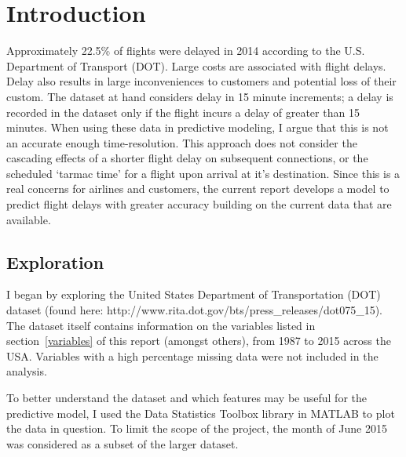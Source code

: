 \documentclass[a4paper, 10pt]{article}
\begin{document}
\clearpage

\section{Introduction}\label{intro}

Approximately 22.5\% of flights were delayed in 2014 according to the U.S. Department of Transport (DOT). Large costs are associated with flight delays.  Delay also results in large inconveniences to customers and potential loss of their custom. The dataset at hand considers delay in 15 minute increments; a delay is recorded in the dataset only if the flight incurs a delay of greater than 15 minutes. When using these data in predictive modeling, I argue that this is not an accurate enough time-resolution. This approach does not consider the cascading effects of a shorter flight delay on subsequent connections, or the scheduled `tarmac time' for a flight upon arrival at it's destination. Since this is a real concerns for airlines and customers, the current report develops a model to predict flight delays with greater accuracy building on the current data that are available. 

\subsection{Exploration}
I began by exploring the United States Department of Transportation (DOT) dataset (found here: http://www.rita.dot.gov/bts/press\_releases/dot075\_15). The dataset itself contains information on the variables listed in section~\ref{variables} of this report (amongst others), from 1987 to 2015 across the USA. Variables with a high percentage missing data were not included in the analysis.

\vspace{5mm}
To better understand the dataset and which features may be useful for the predictive model, I used the Data Statistics Toolbox library in MATLAB to plot the data in question. To limit the scope of the project, the month of June 2015 was considered as a subset of the larger dataset. 
\end{document}
